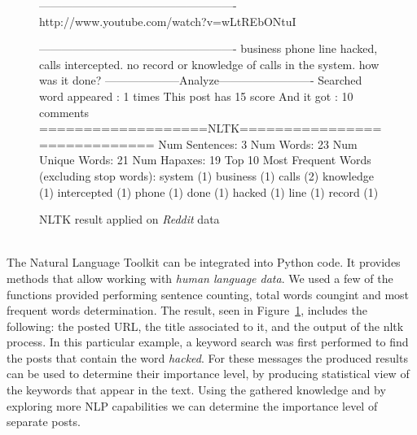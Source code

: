\documentclass[12pt]{article}
\begin{document}
\begin{figure}[h]
\begin{footnotesize}
\begin{spverbatim}
----------------------------------------------------
http://www.youtube.com/watch?v=wLtREbONtuI 

----------------------------------------------------
business phone line hacked, calls intercepted. no record or
knowledge of calls in the system. how was it done?
--------------------Analyze-------------------------
Searched word appeared :  1  times
This post has  15  score
And it got  :  10  comments
===================NLTK=============================
	Num Sentences:           3
	Num Words:               23
	Num Unique Words:        21
	Num Hapaxes:             19
	Top 10 Most Frequent Words (excluding stop words):
		system (1)
		business (1)
		calls (2)
		knowledge (1)
		intercepted (1)
		phone (1)
		done (1)
		hacked (1)
		line (1)
		record (1)
\end{spverbatim}
\end{footnotesize}
\captionsetup{font=small}
\caption{NLTK result applied on \textit{Reddit} data}
\label{fig:nltk}
\end{figure}
\hfill \break
\\
The Natural Language Toolkit \cite{nltk} can be integrated into Python code. It provides methods that allow working with \textit{human language data}. We used a few of the functions provided performing sentence counting, total words coungint and most frequent words determination.  The result, seen in Figure~\ref{fig:nltk}, includes the following: the posted URL, the title associated to it, and the output of the nltk process. In this particular example, a keyword search was first performed to find the posts that contain the word \textit{hacked}. For these messages the produced results can be used to determine their importance level, by producing statistical view of the keywords that appear in the text. Using the gathered knowledge and by exploring more NLP capabilities we can determine the importance level of separate posts.
\newpage
\end{document}
